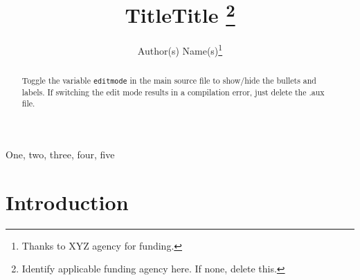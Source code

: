 \documentclass{article}
\begin{document}
\if{}
    \title{Title}
    \address{Author Affiliation(s)}
\else
    \title{Title
        \thanks{Identify applicable funding agency here. If none, delete this.}}


    \author{Author(s) Name(s)\thanks{Thanks to XYZ agency for funding.}}
\fi

\maketitle


\begin{abstract}
    Toggle the variable \texttt{editmode} in the main source file to
    show/hide the bullets and labels. If switching the edit mode results
    in a compilation error, just delete the .aux file.
\end{abstract}


\begin{IEEEkeywords}
    One, two, three, four, five
\end{IEEEkeywords}

\section{Introduction}
\begin{bullets}
    \blt[overview]
    \blt[motivation]
    \blt[contributions]
    \blt[notation]
\end{bullets}
\end{document}
